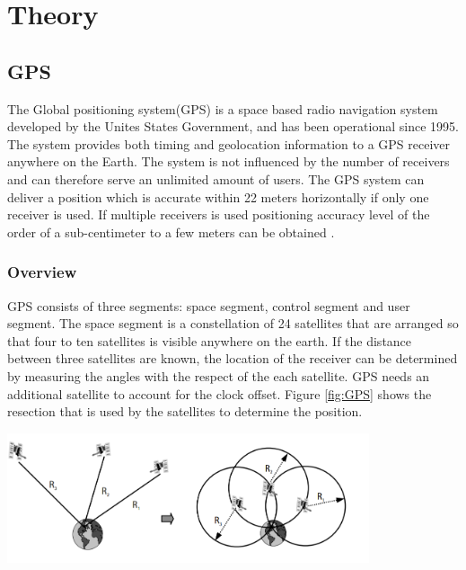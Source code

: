 



\chapter{Theory}
\section{GPS}
The Global positioning system(GPS) is a space based radio navigation system developed by the Unites States Government, and has been operational since 1995. The system provides both timing and geolocation information to a GPS receiver anywhere on the Earth.  The system is not influenced by the number of receivers and can therefore serve an unlimited amount of users. The GPS system can deliver a position which is accurate within 22 meters horizontally if only one receiver is used. If multiple receivers is used positioning accuracy level of the order of a sub-centimeter to a few meters can be obtained \cite{GPS}. 

\subsection{Overview}
GPS consists of three segments: space segment, control segment and user segment. The space segment is a constellation of 24 satellites that are arranged so that four to ten satellites is visible anywhere on the earth. If the distance between three satellites are known, the location of the receiver can be determined by measuring the angles with the respect of the each satellite.  GPS needs an additional satellite to account for the clock offset. Figure \ref{fig:GPS} shows the resection that is used by the satellites to determine the position.\\

\begin{minipage}[t]{0.8\textwidth}
\centering
    \includegraphics[width=0.8\textwidth]{Images/gps.PNG}\\
    \captionsetup{justification=centering}
    \label{fig:GPS}
\end{minipage}

